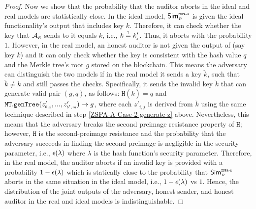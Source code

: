 \begin{proof}
Now we show that the probability that the auditor aborts in the ideal and real models are statistically close. In the ideal model, $\mathsf{Sim}^{\scriptscriptstyle \mathtt{ZSPA\text{-}A}}_{\scriptscriptstyle R}$ is given the ideal functionality's output that includes key $ k$. Therefore, it can check whether the key that $\mathcal{A}_{\scriptscriptstyle R}$ sends to it equals $ k$, i.e., $ k\stackrel{\scriptscriptstyle ?}=    k'_{\scriptscriptstyle j}$. Thus, it aborts with the probability $1$. However, in the real model, an honest auditor is not given the output of \ct (say key $k$) and it can only check whether the key is consistent with the hash value $q$ and the Merkle tree's root $g$ stored on the blockchain. This means the adversary can distinguish the two models if in the real model it sends a key $\ddot k$, such that $\ddot k\neq k$ and still passes the checks. Specifically, it sends the invalid key $\ddot k$ that can generate  valid pair $(g, q)$, as follows: $\mathtt{H}(\ddot k)=q$ and $\mathtt{MT.genTree}(z'_{\scriptscriptstyle 0,1}, ..., z'_{\scriptscriptstyle b', m})\rightarrow  g$, where each $z'_{\scriptscriptstyle i,j}$ is derived from $\ddot k$ using the same technique described in step \ref{ZSPA-A-Case-2-generate-z} above. Nevertheless, this means that the adversary breaks the second preimage resistance property of  $\mathtt{H}$; however, $\mathtt{H}$ is the second-preimage resistance and the probability that the adversary succeeds in finding the second preimage is negligible in the security parameter, i.e., $\epsilon(\lambda)$ where $\lambda$ is the hash function's security parameter. Therefore, in the real model, the auditor aborts if an invalid key is provided with a probability $1-\epsilon(\lambda)$ which is statically close to the probability that $\mathsf{Sim}^{\scriptscriptstyle \mathtt{ZSPA\text{-}A}}_{\scriptscriptstyle R}$ aborts in the same situation in the ideal model, i.e., $1-\epsilon(\lambda)$ vs $1$. 
Hence, the distribution of the joint outputs of the adversary, honest sender, and honest auditor in the real and ideal models is indistinguishable.
%

\end{proof}
